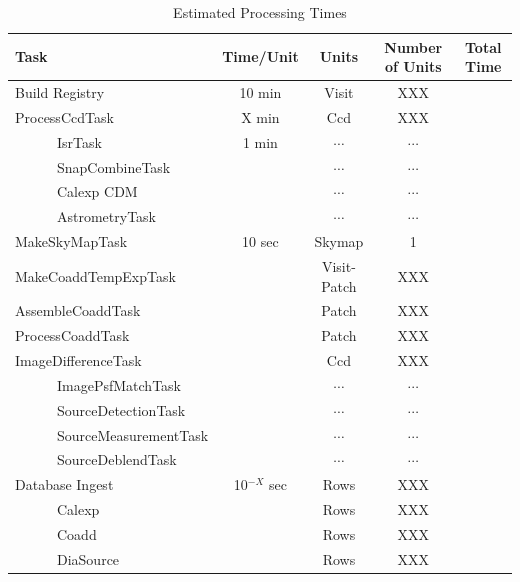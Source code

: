\documentclass[12pt]{article}
\begin{document}
\begin{table}[h]
\small
\begin{center}
\caption{\label{tab-pars} Estimated Processing Times}
\begin{tabular}{lcccc}
\hline \hline
Task                          & Time/Unit     & Units        & Number of Units & Total Time\\
\hline
Build Registry                & 10 min        & Visit        & XXX             &           \\ 
ProcessCcdTask                & X min         & Ccd          & XXX             &           \\ %
~~~~~~IsrTask                 & 1 min         & $\cdots$     & $\cdots$        &           \\
~~~~~~SnapCombineTask         &               & $\cdots$     & $\cdots$        &           \\
~~~~~~Calexp CDM              &               & $\cdots$     & $\cdots$        &           \\
~~~~~~AstrometryTask          &               & $\cdots$     & $\cdots$        &           \\
MakeSkyMapTask                & 10 sec        & Skymap       & 1               &           \\
MakeCoaddTempExpTask          &               & Visit-Patch  & XXX             &           \\
AssembleCoaddTask             &               & Patch        & XXX             &           \\   
ProcessCoaddTask              &               & Patch        & XXX             &           \\
ImageDifferenceTask           &               & Ccd          & XXX             &           \\
~~~~~~ImagePsfMatchTask       &               & $\cdots$     & $\cdots$        &           \\
~~~~~~SourceDetectionTask     &               & $\cdots$     & $\cdots$        &           \\
~~~~~~SourceMeasurementTask   &               & $\cdots$     & $\cdots$        &           \\
~~~~~~SourceDeblendTask       &               & $\cdots$     & $\cdots$        &           \\
\hline
Database Ingest               & 10$^{-X}$ sec & Rows         & XXX             &           \\
~~~~~~Calexp                  &               & Rows         & XXX             &           \\
~~~~~~Coadd                   &               & Rows         & XXX             &           \\
~~~~~~DiaSource               &               & Rows         & XXX             &           \\
\hline
\hline
\end{tabular}
\end{center}
\end{table}
\end{document}

